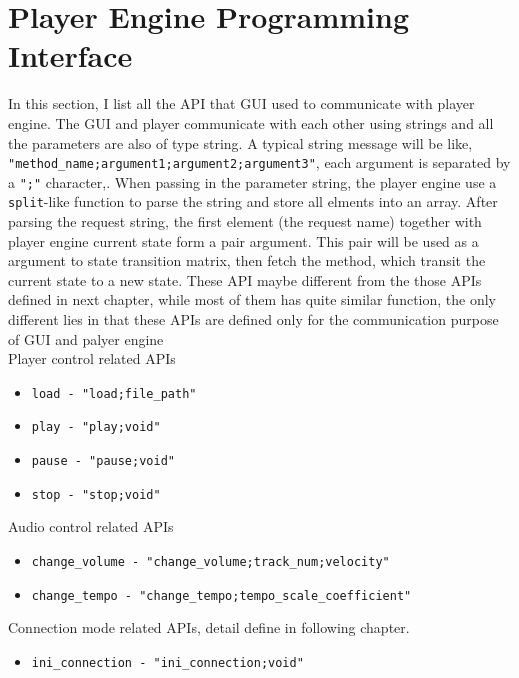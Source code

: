 \section{Player Engine Programming Interface}
In this section, I list all the API that GUI used to communicate with player 
engine. The GUI and player communicate with each other using strings and 
all the parameters are also of type string. A typical string message will be 
like, \texttt{"method\_name;argument1;argument2;argument3"}, each argument is 
separated by a \texttt{";"}
character,. When passing in the parameter string, the player engine
use a \texttt{split}-like function to parse the string and store all elments 
into an array. After parsing the request string, the first element 
(the request name) together with player engine current state form a pair 
argument. This pair will be used as a argument to state transition matrix, 
then fetch the method, which transit the current state to a new state.
These API maybe different
from the those APIs defined in next chapter, while most of them has quite similar 
function, the only different lies in that these APIs are defined only for the 
communication purpose of GUI and palyer engine \\
Player control related APIs 
\begin{itemize}
  \item \texttt{load - "load;file\_path"}
  \item \texttt{play - "play;void"}  
  \item \texttt{pause - "pause;void"}
  \item \texttt{stop - "stop;void"}
\end{itemize}
Audio control related APIs
\begin{itemize}
  \item \texttt{change\_volume - "change\_volume;track\_num;velocity"}  
  \item \texttt{change\_tempo - "change\_tempo;tempo\_scale\_coefficient"}  
\end{itemize}
Connection mode related APIs, detail define in following chapter.
\begin{itemize}
  \item \texttt{ini\_connection - "ini\_connection;void"}  
\end{itemize}
